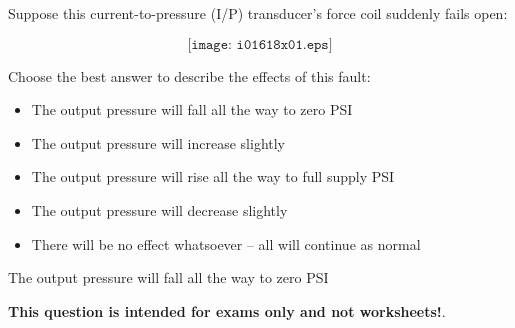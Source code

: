 

Suppose this current-to-pressure (I/P) transducer's force coil suddenly fails open:

$$\texttt{[image: i01618x01.eps]}$$

\noindent
Choose the best answer to describe the effects of this fault:

\begin{itemize}
\item{} The output pressure will fall all the way to zero PSI
\vskip 10pt
\item{} The output pressure will increase slightly 
\vskip 10pt
\item{} The output pressure will rise all the way to full supply PSI 
\vskip 10pt
\item{} The output pressure will decrease slightly 
\vskip 10pt
\item{} There will be no effect whatsoever -- all will continue as normal
\end{itemize}








The output pressure will fall all the way to zero PSI







{\bf This question is intended for exams only and not worksheets!}.



